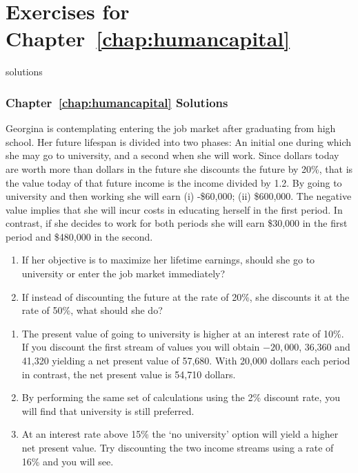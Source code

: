 \newpage
\section*{Exercises for Chapter~\ref{chap:humancapital}}

\begin{Filesave}{solutions}
\subsubsection*{Chapter~\ref{chap:humancapital} Solutions}
\end{Filesave}

\begin{enumialphparenastyle}

\begin{econex}\label{ex:ch13ex1}
Georgina is contemplating entering the job market after graduating from high school. Her future lifespan is divided into two phases: An initial one during which she may go to university, and a second when she will work. Since dollars today are worth more than dollars in the future she discounts the future by 20\%, that is the value today of that future income is the income divided by 1.2. By going to university and then working she will earn (i) -\$60,000; (ii) \$600,000. The negative value implies that she will incur costs in educating herself in the first period. In contrast, if she decides to work for both periods she will earn \$30,000 in the first period and \$480,000 in the second. 
\begin{enumerate}
\item	If her objective is to maximize her lifetime earnings, should she go to university or enter the job market immediately?
\item	If instead of discounting the future at the rate of  20\%, she discounts it at the rate of 50\%, what should she do?
\end{enumerate}
\begin{econsolution}
\begin{enumerate}
\item	The present value of going to university is higher at an interest rate of 10\%. If you discount the first stream of values you will obtain $-20,000$, 36,360 and 41,320 yielding a net present value of 57,680. With 20,000 dollars each period in contrast, the net present value is 54,710 dollars.
\item	By performing the same set of calculations using the 2\% discount rate, you will find that university is still preferred.
\item	At an interest rate above 15\% the `no university' option will yield a higher net present value. Try discounting the two income streams using a rate of 16\% and you will see.
\end{enumerate}
\end{econsolution}
\end{econex}


\end{enumialphparenastyle}
